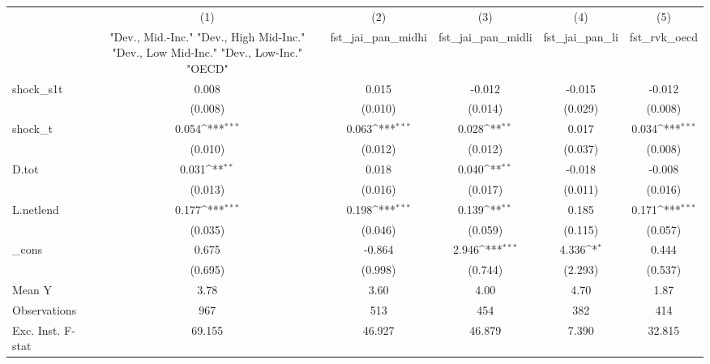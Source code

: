 {
\def\sym#1{\ifmmode^{#1}\else\(^{#1}\)\fi}
\begin{tabular}{l*{5}{c}}
\toprule
            &\multicolumn{1}{c}{(1)}&\multicolumn{1}{c}{(2)}&\multicolumn{1}{c}{(3)}&\multicolumn{1}{c}{(4)}&\multicolumn{1}{c}{(5)}\\
            &\multicolumn{1}{c}{ "Dev., Mid.-Inc." "Dev., High Mid-Inc." "Dev., Low Mid-Inc." "Dev., Low-Inc." "OECD" }&\multicolumn{1}{c}{fst\_jai\_pan\_midhi}&\multicolumn{1}{c}{fst\_jai\_pan\_midli}&\multicolumn{1}{c}{fst\_jai\_pan\_li}&\multicolumn{1}{c}{fst\_rvk\_oecd}\\
\midrule
shock\_s1t   &       0.008         &       0.015         &      -0.012         &      -0.015         &      -0.012         \\
            &     (0.008)         &     (0.010)         &     (0.014)         &     (0.029)         &     (0.008)         \\
\addlinespace
shock\_t     &       0.054\sym{***}&       0.063\sym{***}&       0.028\sym{**} &       0.017         &       0.034\sym{***}\\
            &     (0.010)         &     (0.012)         &     (0.012)         &     (0.037)         &     (0.008)         \\
\addlinespace
D.tot       &       0.031\sym{**} &       0.018         &       0.040\sym{**} &      -0.018         &      -0.008         \\
            &     (0.013)         &     (0.016)         &     (0.017)         &     (0.011)         &     (0.016)         \\
\addlinespace
L.netlend   &       0.177\sym{***}&       0.198\sym{***}&       0.139\sym{**} &       0.185         &       0.171\sym{***}\\
            &     (0.035)         &     (0.046)         &     (0.059)         &     (0.115)         &     (0.057)         \\
\addlinespace
\_cons      &       0.675         &      -0.864         &       2.946\sym{***}&       4.336\sym{*}  &       0.444         \\
            &     (0.695)         &     (0.998)         &     (0.744)         &     (2.293)         &     (0.537)         \\
\midrule
Mean Y      &        3.78         &        3.60         &        4.00         &        4.70         &        1.87         \\
Observations&         967         &         513         &         454         &         382         &         414         \\
Exc. Inst. F-stat&      69.155         &      46.927         &      46.879         &       7.390         &      32.815         \\
\bottomrule
\end{tabular}
}
